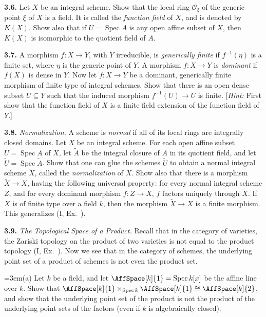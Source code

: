 {\smallskip
\noindent\hypertarget{ex-II-3.6}{}\textbf{3.6.} Let $X$ be an integral scheme. Show that the local ring $\mathcal O_\xi$ of the generic point $\xi$ of $X$ is a field. It is called the \emph{function field} of $X$, and is denoted by $K(X)$. Show also that if $U=\operatorname{Spec} A$ is any open affine subset of $X$, then $K(X)$ is isomorphic to the quotient field of $A$.

\smallskip
\noindent\hypertarget{ex-II-3.7}{}\textbf{3.7.} A morphism $f\colon X\to Y$, with $Y$ irreducible, is \emph{generically finite} if $f^{-1}(\eta)$ is a finite set, where $\eta$ is the generic point of $Y$. A morphism $f\colon X\to Y$ is \emph{dominant} if $f(X)$ is dense in $Y$. Now let $f\colon X\to Y$ be a dominant, generically finite morphism of finite type of integral schemes. Show that there is an open dense subset $U\subseteq Y$ such that the induced morphism $f^{-1}(U)\to U$ is finite. [\emph{Hint:} First show that the function field of $X$ is a finite field extension of the function field of $Y$.]

\smallskip
\noindent\hypertarget{ex-II-3.8}{}\textbf{3.8.} \emph{Normalization.} A scheme is \emph{normal} if all of its local rings are integrally closed domains. Let $X$ be an integral scheme. For each open affine subset $U=\operatorname{Spec} A$ of $X$, let $\widetilde A$ be the integral closure of $A$ in its quotient field, and let $\widetilde U=\operatorname{Spec}\widetilde A$. Show that one can glue the schemes $\widetilde U$ to obtain a normal integral scheme $\widetilde X$, called the \emph{normalization} of $X$. Show also that there is a morphism $\widetilde X\to X$, having the following universal property: for every normal integral scheme $Z$, and for every dominant morphism $f\colon Z\to X$, $f$ factors uniquely through $\widetilde X$. If $X$ is of finite type over a field $k$, then the morphism $\widetilde X\to X$ is a finite morphism. This generalizes (I, Ex.~).

\smallskip
\noindent\hypertarget{ex-II-3.9}{}\textbf{3.9.} \emph{The Topological Space of a Product.} Recall that in the category of varieties, the Zariski topology on the product of two varieties is not equal to the product topology (I, Ex.~). Now we see that in the category of schemes, the underlying point set of a product of schemes is not even the product set.

\noindent\hangindent=3em\hspace*{1.7em}(a) Let $k$ be a field, and let $\AffSpace[k]{1}=\operatorname{Spec} k[x]$ be the affine line over $k$. Show that $\AffSpace[k]{1}\times_{\operatorname{Spec}k}\AffSpace[k]{1}\cong\AffSpace[k]{2}$, and show that the underlying point set of the product is not the product of the underlying point sets of the factors (even if $k$ is algebraically closed).}
